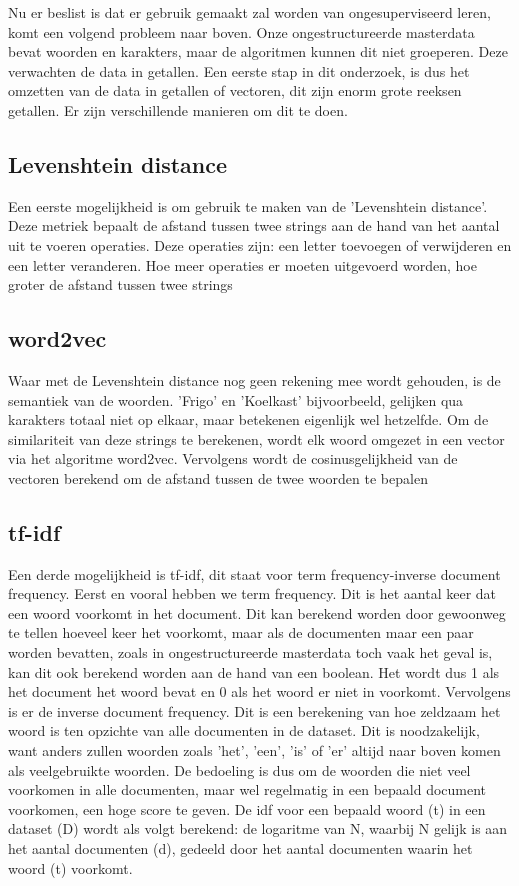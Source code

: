 Nu er beslist is dat er gebruik gemaakt zal worden van ongesuperviseerd leren, komt een volgend probleem naar boven. Onze ongestructureerde masterdata bevat woorden en karakters, maar de algoritmen kunnen dit niet groeperen. Deze verwachten de data in getallen. Een eerste stap in dit onderzoek, is dus het omzetten van de data in getallen of vectoren, dit zijn enorm grote reeksen getallen. Er zijn verschillende manieren om dit te doen.
\subsection{Levenshtein distance}
Een eerste mogelijkheid is om gebruik te maken van de 'Levenshtein distance'. Deze metriek bepaalt de afstand tussen twee strings aan de hand van het aantal uit te voeren operaties. Deze operaties zijn: een letter toevoegen of verwijderen en een letter veranderen. Hoe meer operaties er moeten uitgevoerd worden, hoe groter de afstand tussen twee strings %

\subsection{word2vec}
Waar met de Levenshtein distance nog geen rekening mee wordt gehouden, is de semantiek van de woorden. 'Frigo' en 'Koelkast' bijvoorbeeld, gelijken qua karakters totaal niet op elkaar, maar betekenen eigenlijk wel hetzelfde. Om de similariteit van deze strings te berekenen, wordt elk woord omgezet in een vector via het algoritme word2vec. Vervolgens wordt de cosinusgelijkheid van de vectoren berekend om de afstand tussen de twee woorden te bepalen %

\subsection{tf-idf}
Een derde mogelijkheid is tf-idf, dit staat voor term frequency-inverse document frequency. Eerst en vooral hebben we term frequency. Dit is het aantal keer dat een woord voorkomt in het document. Dit kan berekend worden door gewoonweg te tellen hoeveel keer het voorkomt, maar als de documenten maar een paar worden bevatten, zoals in ongestructureerde masterdata toch vaak het geval is, kan dit ook berekend worden aan de hand van een boolean. Het wordt dus 1 als het document het woord bevat en 0 als het woord er niet in voorkomt. Vervolgens is er de inverse document frequency. Dit is een berekening van hoe zeldzaam het woord is ten opzichte van alle documenten in de dataset. Dit is noodzakelijk, want anders zullen woorden zoals 'het', 'een', 'is' of 'er' altijd naar boven komen als veelgebruikte woorden. De bedoeling is dus om de woorden die niet veel voorkomen in alle documenten, maar wel regelmatig in een bepaald document voorkomen, een hoge score te geven. De idf voor een bepaald woord (t) in een dataset (D) wordt als volgt berekend: de logaritme van N, waarbij N gelijk is aan het aantal documenten (d), gedeeld door het aantal documenten waarin het woord (t) voorkomt.


